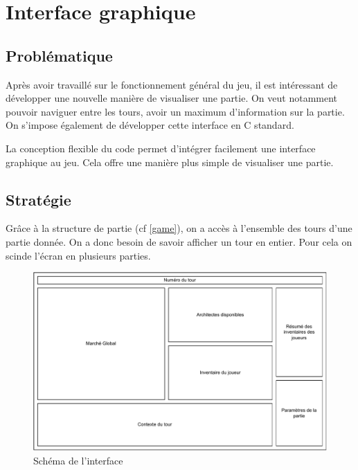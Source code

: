 \section{Interface graphique}

\label{cli}

\subsection*{Problématique}

Après avoir travaillé sur le fonctionnement général du jeu, il est intéressant de développer une nouvelle manière de visualiser une partie. On veut notamment pouvoir naviguer entre les tours, avoir un maximum d'information sur la partie. 
On s'impose également de développer cette interface en C standard.

\begin{summary}
La conception flexible du code permet d'intégrer facilement une interface graphique au jeu. Cela offre une manière plus simple de visualiser une partie.
\end{summary} 

\subsection{Stratégie}

Grâce à la structure de partie (cf \ref{game}), on a accès à l'ensemble des tours d'une partie donnée. On a donc besoin de savoir afficher un tour en entier. Pour cela on scinde l'écran en plusieurs parties.

\begin{figure}[H]
    \centering
    \includegraphics[width=\textwidth]{img/cli_schema.pdf}
    \caption{Schéma de l'interface}
    \label{fig:cli_schem}
\end{figure}

